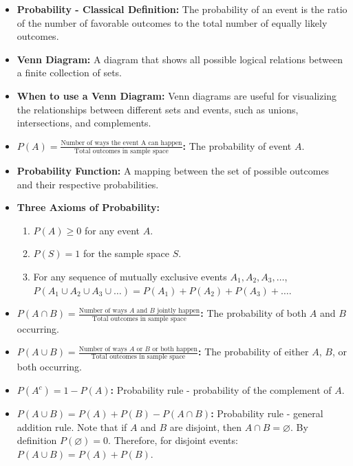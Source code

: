 \documentclass{article}
\let\emptyset\varnothing
\begin{document}
\begin{itemize}
    \item \textbf{Probability - Classical Definition:} The probability of an event is the ratio of the number of favorable outcomes to the total number of equally likely outcomes.

    \item \textbf{Venn Diagram:} A diagram that shows all possible logical relations between a finite collection of sets.

    \item \textbf{When to use a Venn Diagram:} Venn diagrams are useful for visualizing the relationships between different sets and events, such as unions, intersections, and complements.

    \item \textbf{\( P(A) = \frac{\text{Number of ways the event A can happen}}{\text{Total outcomes in sample space}} \):} The probability of event \( A \).

    \item \textbf{Probability Function:} A mapping between the set of possible outcomes and their respective probabilities.

    \item \textbf{Three Axioms of Probability:}
    \begin{enumerate}
        \item \( P(A) \geq 0 \) for any event \( A \).
        \item \( P(S) = 1 \) for the sample space \( S \).
        \item For any sequence of mutually exclusive events \( A_1, A_2, A_3, \ldots \), \( P(A_1 \cup A_2 \cup A_3 \cup \ldots) = P(A_1) + P(A_2) + P(A_3) + \ldots \).
    \end{enumerate}

    \item \textbf{\( P(A \cap B) = \frac{\text{Number of ways } A \text{ and } B \text{ jointly happen}}{\text{Total outcomes in sample space}} \):} The probability of both \( A \) and \( B \) occurring.

    \item \textbf{\( P(A \cup B) = \frac{\text{Number of ways } A \text{ or } B \text{ or both happen}}{\text{Total outcomes in sample space}} \):} The probability of either \( A \), \( B \), or both occurring.

    \item \textbf{\( P(A^c) = 1 - P(A) \):} Probability rule - probability of the complement of \( A \).

    \item \textbf{\( P(A \cup B) = P(A) + P(B) - P(A \cap B) \):} Probability rule - general addition rule. Note that if \( A \) and \( B \) are disjoint, then \( A \cap B = \emptyset \). By definition \( P(\emptyset) = 0 \). Therefore, for disjoint events: \( P(A \cup B) = P(A) + P(B) \).


\end{itemize}
\end{document}
